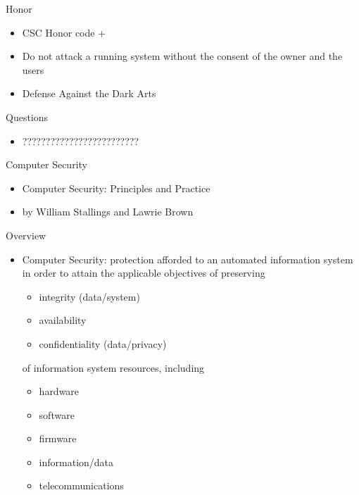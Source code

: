 \documentclass{beamer}
\begin{document}
\begin{frame}{Honor}
  \begin{itemize}
  \item CSC Honor code +
  \item \alert{Do not attack a running system 
    without the consent of the owner 
    and the users}
  \item Defense Against the Dark Arts
  \end{itemize}
\end{frame}

\begin{frame}{Questions}
  \begin{itemize}
  \item ?????????????????????????
  \end{itemize}
\end{frame}

\begin{frame}{Computer Security}
  \begin{itemize}
  \item Computer Security: Principles and Practice
  \item by William Stallings and Lawrie Brown
  \end{itemize}
\end{frame}

\begin{frame}{Overview}
  \begin{itemize}
  \item \alert{Computer Security}: protection afforded to an 
    automated information system in order to attain 
    the applicable objectives of preserving
    
    \begin{itemize}
    \item integrity (data/system)
    \item availability
    \item confidentiality (data/privacy)
    \end{itemize}
of  information system resources, including
 
\begin{itemize}
  \item hardware
  \item software
  \item firmware
  \item information/data
  \item telecommunications
\end{itemize}
  \end{itemize}
\end{frame}
\end{document}
